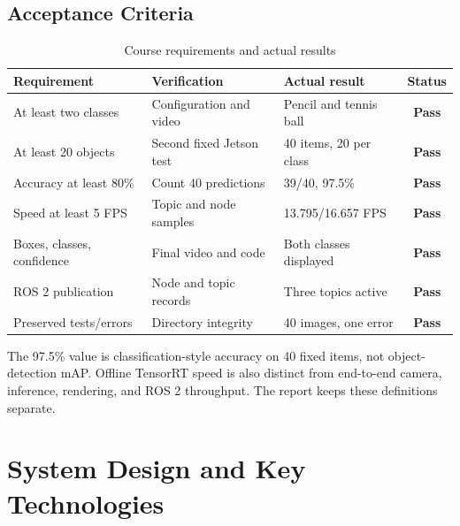 \documentclass[UTF8,zihao=-4,scheme=chinese,fontset=none]{ctexart}
\newcommand{\passmark}{\textbf{Pass}}
\begin{document}
\subsection{Acceptance Criteria}
\begin{table}[H]\centering\caption{Course requirements and actual results}
\begin{tabularx}{\textwidth}{Y Y Y c}\toprule Requirement & Verification & Actual result & Status\\\midrule
At least two classes & Configuration and video & Pencil and tennis ball & \passmark\\
At least 20 objects & Second fixed Jetson test & 40 items, 20 per class & \passmark\\
Accuracy at least 80\% & Count 40 predictions & 39/40, 97.5\% & \passmark\\
Speed at least 5 FPS & Topic and node samples & 13.795/16.657 FPS & \passmark\\
Boxes, classes, confidence & Final video and code & Both classes displayed & \passmark\\
ROS 2 publication & Node and topic records & Three topics active & \passmark\\
Preserved tests/errors & Directory integrity & 40 images, one error & \passmark\\\bottomrule
\end{tabularx}\end{table}
The 97.5\% value is classification-style accuracy on 40 fixed items, not object-detection mAP. Offline TensorRT speed is also distinct from end-to-end camera, inference, rendering, and ROS 2 throughput. The report keeps these definitions separate.

\section{System Design and Key Technologies}
\end{document}
